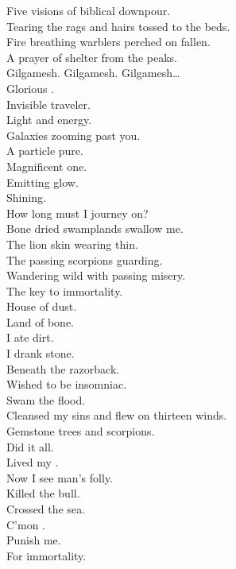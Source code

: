 Five visions of biblical downpour. \\
Tearing the rags and hairs tossed to the  beds. \\
Fire breathing warblers perched on fallen. \\
A prayer of shelter from the peaks. \\

Gilgamesh. Gilgamesh. Gilgamesh… \\

Glorious . \\
Invisible traveler. \\
Light and energy. \\
Galaxies zooming past you. \\
A particle pure. \\
Magnificent one. \\
Emitting glow. \\
Shining. \\
How long must I journey on? \\

Bone dried swamplands swallow me. \\
The lion skin wearing thin. \\
The passing scorpions guarding. \\
Wandering wild with passing misery. \\
The key to immortality. \\

House of dust. \\
Land of bone. \\
I ate dirt. \\
I drank stone. \\
Beneath the razorback. \\
Wished to be insomniac. \\
Swam the flood. \\
Cleansed my sins and flew on thirteen winds. \\
Gemstone trees and scorpions. \\
Did it all. \\
Lived my . \\
Now I see man's folly. \\
Killed the bull. \\
Crossed the sea. \\
C'mon . \\
Punish me. \\
For immortality. \\

